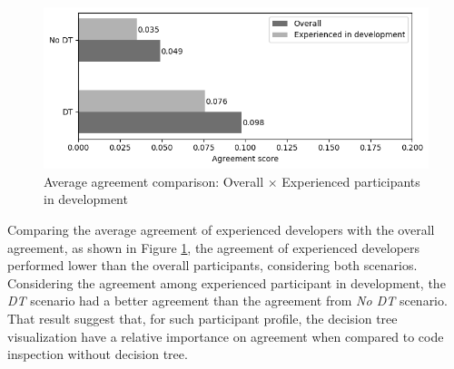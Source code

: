 \begin{figure}[ht]
\centering
\includegraphics[width=15cm]{figures/overallXdevelopment.png}
\caption{Average agreement comparison: Overall $\times$ Experienced participants in development}
\label{fig:overallxdevelopment}
\end{figure}

Comparing the average agreement of experienced developers with the overall agreement, as shown in Figure \ref{fig:overallxdevelopment}, the agreement of experienced developers performed lower than the overall participants, considering both scenarios. Considering the agreement among experienced participant in development,  the \textit{DT} scenario had a better agreement than the agreement from \textit{No DT} scenario. That result suggest that, for such participant profile, the decision tree visualization have a relative importance on agreement when compared to code inspection without decision tree.







